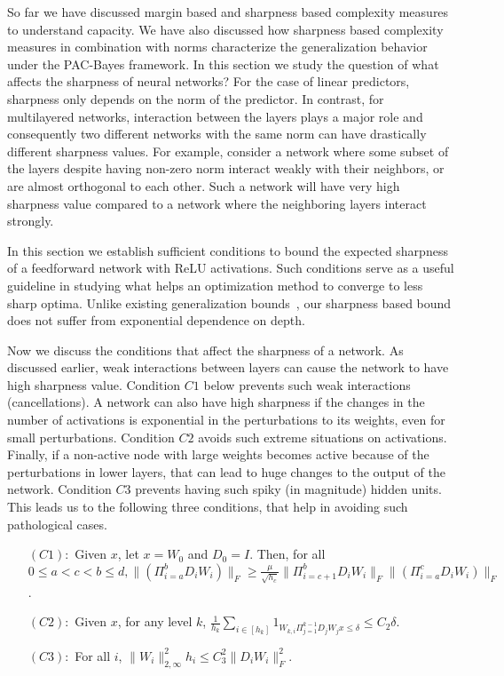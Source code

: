 \documentclass{article}
\begin{document}
So far we have discussed margin based and sharpness based complexity measures to understand capacity. We have also discussed how sharpness based complexity measures in combination with norms characterize the generalization behavior under the PAC-Bayes framework. In this section we study the question of what affects the sharpness of neural networks? For the case of linear predictors, sharpness only depends on the norm of the predictor. In contrast, for multilayered networks, interaction between the layers plays a major role and consequently two different networks with the same norm can have drastically different sharpness values. For example, consider a network where some subset of the layers despite having non-zero norm interact weakly with their neighbors, or are almost orthogonal to each other. Such a network will have very high sharpness value compared to a network where the neighboring layers interact strongly.

In this section we establish sufficient conditions to bound the expected sharpness of a feedforward network with ReLU activations.  Such conditions serve as a useful guideline in studying what helps an optimization method to converge to less sharp optima. Unlike existing generalization bounds~\cite{bartlett2002rademacher,NeyTomSre15,luxburg2004distance,xu2012robustness,sokolic2016generalization}, our sharpness based bound does not suffer from exponential dependence on depth.


Now we discuss the conditions that affect the sharpness of a network. As discussed earlier, weak interactions between layers can cause the network to have high sharpness value. Condition $C1$ below prevents such weak interactions (cancellations). A network can also have high sharpness if the changes in the number of activations is exponential in the perturbations to its weights, even for small perturbations. Condition $C2$ avoids such extreme situations on activations. Finally, if a non-active node with large weights becomes active because of the perturbations in lower layers, that can lead to huge changes to the output of the network. Condition $C3$ prevents having such spiky (in magnitude) hidden units. This leads us to the following three conditions, that help in avoiding such pathological cases.


\begin{itemize}
\item[$(C1):$] Given $x$, let $x=W_0$ and $D_0 =I$. Then, for all $0 \leq a < c < b \leq d, \| \left(\Pi_{i=a}^{b} D_{i}W_i \right)\|_F \geq  \frac{\mu}{\sqrt{h_c}}  \| \Pi_{i=c+1}^{b} D_{i}W_i  \|_F \|  \left(\Pi_{i=a}^{c} D_{i}W_i \right)\|_F $.
\item[$(C2):$] Given $x$, for any level $k$, $\frac{1}{h_k} \sum_{i \in [h_k]} 1_{W_{k,i} \Pi_{j=1}^{k-1} D_j W_j x \leq \delta} \leq C_2 \delta$.
\item[$(C3):$] For all $i$, $\| W_{i}\|_{2,\infty}^2  h_i \leq C_3^2 \|D_i W_i\|_F^2$.
\end{itemize}
\end{document}
